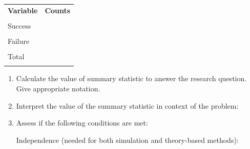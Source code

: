 \documentclass[
]{report}
\begin{document}
\begingroup
\begin{center}
\setlength{\tabcolsep}{14pt} 
\renewcommand{\arraystretch}{2} 
\begin{tabular}{|p{2in}|p{2in}|}
\hline
 {\textbf{Variable}} & {\textbf{Counts}} \\ 
 & \\ \hline
 Success & \\ 
 &  \\ \hline
 Failure & \\ 
 &  \\ \hline
 Total &  \\ 
 & \\ \hline  
\end{tabular}
\end{center}
\endgroup

\begin{enumerate}
\def\labelenumi{\alph{enumi}.}
\setcounter{enumi}{4}
\item
  Calculate the value of summary statistic to answer the research question. Give appropriate notation.
  \vspace{0.3in}
\item
  Interpret the value of the summary statistic in context of the problem:
  \vspace{0.3in}
\item
  Assess if the following conditions are met:

  Independence (needed for both simulation and theory-based methods):
  \vspace{0.8in}


\end{enumerate}
\end{document}
